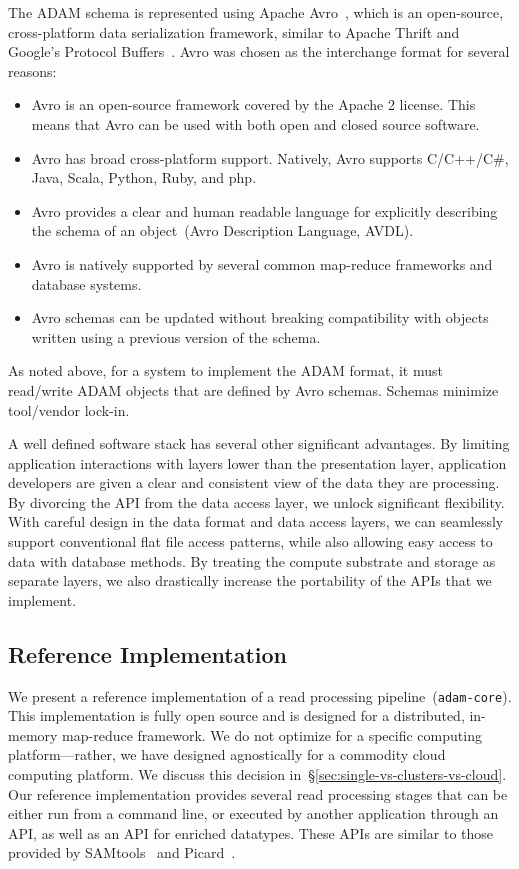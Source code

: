 \documentclass{bioinfo}
\begin{document}
The ADAM schema is represented using Apache Avro~\citep{avro}, which is an open-source, cross-platform data serialization framework, similar
to Apache Thrift and Google's Protocol Buffers~\citep{thrift, protobuf}. Avro was chosen as the interchange format for several reasons:

\begin{itemize}
\item Avro is an open-source framework covered by the Apache 2 license. This means that Avro can be used with both open and closed source software.
\item Avro has broad cross-platform support. Natively, Avro supports C/C++/C\#, Java, Scala, Python, Ruby, and php.
\item Avro provides a clear and human readable language for explicitly describing the schema of an object~(Avro Description Language, AVDL).
\item Avro is natively supported by several common map-reduce frameworks and database systems.
\item Avro schemas can be updated without breaking compatibility with objects written using a previous version of the schema.
\end{itemize}

As noted above, for a system to implement the ADAM format, it must read/write ADAM objects that are defined by Avro schemas. Schemas minimize
tool/vendor lock-in.

A well defined software stack has several other significant advantages. By limiting application interactions with layers lower than the presentation layer,
application developers are given a clear and consistent view of the data they are processing. By divorcing the API from the data
access layer, we unlock significant flexibility. With careful design in the data format and data access layers, we can seamlessly
support conventional flat file access patterns, while also allowing easy access to data with database methods. By treating the
compute substrate and storage as separate layers, we also drastically increase the portability of the APIs that we implement.

\subsection{Reference Implementation}
\label{sec:reference-implementation}

We present a reference implementation of a read processing pipeline~(\texttt{adam-core}). This implementation is fully open source
and is designed for a distributed, in-memory map-reduce framework. We do not optimize for a specific computing platform---rather, we have designed
agnostically for a commodity cloud computing platform. We discuss this decision in~\S\ref{sec:single-vs-clusters-vs-cloud}. Our reference
implementation provides several read processing stages that can be either run from a command line, or executed by another application through
an API, as well as an API for enriched datatypes. These APIs are similar to those provided by SAMtools~\citep{li09} and Picard~\citep{picard}.
\end{document}
